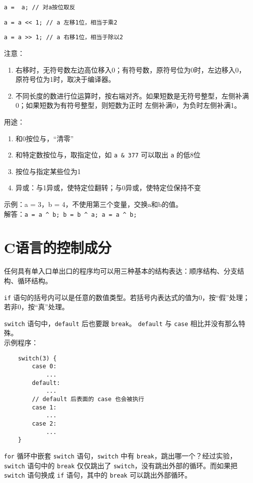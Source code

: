\documentclass[UTF8]{ctexart}
\begin{document}
\texttt{a = ~a;        // 对a按位取反}

\texttt{a = a << 1;    // a 左移1位，相当于乘2}

\texttt{a = a >> 1;    // a 右移1位，相当于除以2}

注意：
\begin{enumerate}
    \item 右移时，无符号数左边高位移入0；有符号数，原符号位为0时，左边移入0，原符号位为1时，取决于编译器。
    \item 不同长度的数进行位运算时，按右端对齐。如果短数是无符号整型，左侧补满0；如果短数为有符号整型，则短数为正时
    左侧补满0，为负时左侧补满1。
\end{enumerate}

用途：
\begin{enumerate}
    \item 和0按位与，“清零”
    \item 和特定数按位与，取指定位，如 \texttt{a & 377} 可以取出 \texttt{a} 的低8位
    \item 按位与指定某些位为1
    \item 异或：与1异或，使特定位翻转；与0异或，使特定位保持不变
\end{enumerate}
示例：a = 3，b = 4，不使用第三个变量，交换a和b的值。\\
解答：\texttt{a = a ^ b; b = b ^ a; a = a ^ b;}

\section{C语言的控制成分}
任何具有单入口单出口的程序均可以用三种基本的结构表达：顺序结构、分支结构、循环结构。

\texttt{if} 语句的括号内可以是任意的数值类型。若括号内表达式的值为0，按“假”处理；若非0，按“真”处理。

\texttt{switch} 语句中，\texttt{default} 后也要跟 \texttt{break}。
\texttt{default} 与 \texttt{case} 相比并没有那么特殊。\\
示例程序：
\begin{verbatim}
    switch(3) {
        case 0:
            ...
        default:
            ...
        // default 后表面的 case 也会被执行
        case 1:
            ...
        case 2:
            ...
    }
\end{verbatim}

\texttt{for} 循环中嵌套 \texttt{switch} 语句，\texttt{switch} 中有
\texttt{break}，跳出哪一个？经过实验，\texttt{switch} 语句中的 \texttt{break}
仅仅跳出了 \texttt{switch}，没有跳出外部的循环。而如果把 \texttt{switch} 语句换成
\texttt{if} 语句，其中的 \texttt{break} 可以跳出外部循环。
\end{document}
